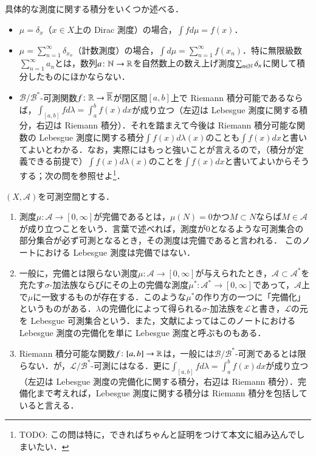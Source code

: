 \begin{exm}具体的な測度に関する積分をいくつか述べる．
\begin{itemize}
\item $\mu = \delta_x$（$x \in X$上の Dirac 測度）の場合，$\int f d \mu = f(x)$．
\item $\mu = \sum_{n=1}^\infty \delta_{x_n}$（計数測度）の場合，$\int d \mu = \sum_{n=1}^\infty f(x_n)$．特に無限級数$\sum_{n=1}^\infty a_n$とは，数列$a \colon \mathbb{N} \to \mathbb{R}$を自然数上の数え上げ測度$\sum_{n \in \mathbb{N}} \delta_n$に関して積分したものにほかならない．
\item $\mathcal{B}/\mathcal{B}^*$-可測関数$f \colon \mathbb{R} \to \overline{\mathbb{R}}$が閉区間$[a,b]$上で Riemann 積分可能であるならば，$\int_{[a,b]} f d \lambda = \int_a^b f(x) dx$が成り立つ（左辺は Lebesgue 測度に関する積分，右辺は Riemann 積分）．それを踏まえて今後は Riemann 積分可能な関数の Lebesgue 測度に関する積分$\int f(x) d \lambda(x)$のことも$\int f(x)dx$と書いてよいとわかる．なお，実際にはもっと強いことが言えるので，（積分が定義できる前提で）$\int f(x) d \lambda(x)$のことを$\int f(x)dx$と書いてよいからそうする；次の問を参照せよ\footnote{TODO: この問は特に，できればちゃんと証明をつけて本文に組み込んでしまいたい．}．
\end{itemize}
\end{exm}

\begin{que}[*] $(X,\mathcal{A})$を可測空間とする．
\begin{enumerate}
\item 測度$\mu \colon \mathcal{A} \to [0,\infty]$が完備であるとは，$\mu(N)=0$かつ$M \subset N$ならば$M \in \mathcal{A}$が成り立つことをいう．言葉で述べれば，測度が0となるような可測集合の部分集合が必ず可測となるとき，その測度は完備であると言われる． このノートにおける Lebesgue 測度は完備ではない．
\item 一般に，完備とは限らない測度$\mu \colon \mathcal{A} \to [0,\infty]$が与えられたとき，$\mathcal{A} \subset \mathcal{A}^*$を充たす$\sigma$-加法族ならびにその上の完備な測度$\mu^* \colon \mathcal{A}^* \to [0,\infty]$であって，$\mathcal{A}$上で$\mu$に一致するものが存在する．このような$\mu^*$の作り方の一つに「完備化」というものがある．$\lambda$の完備化によって得られる$\sigma$-加法族を$\mathcal{L}$と書き，$\mathcal{L}$の元を Lebesgue 可測集合という．また，文献によってはこのノートにおける Lebesgue 測度の完備化を単に Lebesgue 測度と呼ぶものもある．
\item Riemann 積分可能な関数$f \colon [a,b] \to \mathbb{R}$は，一般には$\mathcal{B}/\mathcal{B}^*$-可測であるとは限らない．が，$\mathcal{L}/\mathcal{B}^*$-可測にはなる．更に$\int_{[a,b]} f d \lambda = \int_a^b f(x) dx$が成り立つ（左辺は Lebesgue 測度の完備化に関する積分，右辺は Riemann 積分）．完備化まで考えれば，Lebesgue 測度に関する積分は Riemann 積分を包括していると言える．
\end{enumerate}
\end{que}

